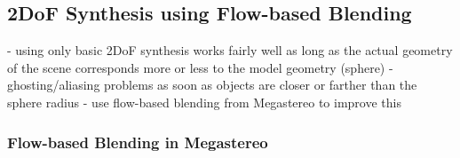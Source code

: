 

\subsection{2DoF Synthesis using Flow-based Blending}
- using only basic 2DoF synthesis works fairly well as long as the actual geometry of the scene corresponds more or less to the model geometry (sphere)
- ghosting/aliasing problems as soon as objects are closer or farther than the sphere radius
- use flow-based blending from Megastereo to improve this


\subsubsection{Flow-based Blending in Megastereo}

